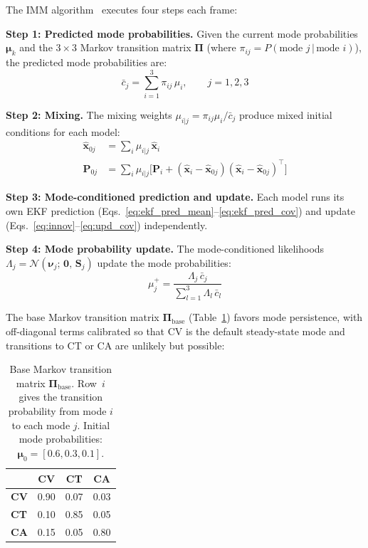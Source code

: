 \documentclass[conference]{IEEEtran}
\begin{document}
The IMM algorithm~\cite{blom1988imm} executes four steps each frame:

\textbf{Step 1: Predicted mode probabilities.} Given the current mode probabilities $\bm{\mu}_k$ and the $3{\times}3$ Markov transition matrix $\bm{\Pi}$ (where $\pi_{ij} = P(\text{mode } j \,|\, \text{mode } i)$), the predicted mode probabilities are:
\begin{equation}
\bar{c}_j = \sum_{i=1}^{3} \pi_{ij}\,\mu_i, \qquad j = 1, 2, 3
\end{equation}

\textbf{Step 2: Mixing.} The mixing weights $\mu_{i|j} = \pi_{ij}\mu_i / \bar{c}_j$ produce mixed initial conditions for each model:
\begin{align}
\hat{\mathbf{x}}_{0j} &= \textstyle\sum_{i} \mu_{i|j}\,\hat{\mathbf{x}}_i \\
\mathbf{P}_{0j} &= \textstyle\sum_{i} \mu_{i|j}\bigl[\mathbf{P}_i + (\hat{\mathbf{x}}_i - \hat{\mathbf{x}}_{0j})(\hat{\mathbf{x}}_i - \hat{\mathbf{x}}_{0j})^\top\bigr]
\end{align}

\textbf{Step 3: Mode-conditioned prediction and update.} Each model runs its own EKF prediction (Eqs.~\ref{eq:ekf_pred_mean}--\ref{eq:ekf_pred_cov}) and update (Eqs.~\ref{eq:innov}--\ref{eq:upd_cov}) independently.

\textbf{Step 4: Mode probability update.} The mode-conditioned likelihoods $\Lambda_j = \mathcal{N}(\bm{\nu}_j;\, \mathbf{0},\, \mathbf{S}_j)$ update the mode probabilities:
\begin{equation}
\mu_j^{+} = \frac{\Lambda_j \, \bar{c}_j}{\sum_{l=1}^{3} \Lambda_l \, \bar{c}_l}
\end{equation}

The base Markov transition matrix $\bm{\Pi}_{\text{base}}$ (Table~\ref{tab:pi}) favors mode persistence, with off-diagonal terms calibrated so that CV is the default steady-state mode and transitions to CT or CA are unlikely but possible:

\begin{table}[!t]
\centering
\caption{Base Markov transition matrix $\bm{\Pi}_{\text{base}}$. Row~$i$ gives the transition probability from mode $i$ to each mode $j$. Initial mode probabilities: $\bm{\mu}_0 = [0.6, 0.3, 0.1]$.}
\label{tab:pi}
\begin{tabular}{@{}lccc@{}}
\toprule
& \textbf{CV} & \textbf{CT} & \textbf{CA} \\
\midrule
\textbf{CV} & 0.90 & 0.07 & 0.03 \\
\textbf{CT} & 0.10 & 0.85 & 0.05 \\
\textbf{CA} & 0.15 & 0.05 & 0.80 \\
\bottomrule
\end{tabular}
\end{table}
\end{document}

